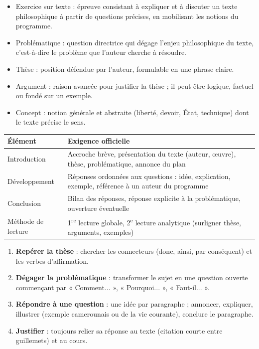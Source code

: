 \documentclass[11pt]{article}
\newcommand{\cle}[1]{{\popxbold\color{popdark}#1}}
\begin{document}
\begin{definition}
\begin{itemize}
\item \cle{Exercice sur texte} : épreuve consistant à expliquer et à discuter un texte philosophique à partir de questions précises, en mobilisant les notions du programme.
\item \cle{Problématique} : question directrice qui dégage l'enjeu philosophique du texte, c'est-à-dire le problème que l'auteur cherche à résoudre.
\item \cle{Thèse} : position défendue par l'auteur, formulable en une phrase claire.
\item \cle{Argument} : raison avancée pour justifier la thèse ; il peut être logique, factuel ou fondé sur un exemple.
\item \cle{Concept} : notion générale et abstraite (liberté, devoir, État, technique) dont le texte précise le sens.
\end{itemize}
\end{definition}

\begin{aretenir}
\begin{center}
\begin{tabularx}{\linewidth}{|l|X|}\hline
\rowcolor{popblueL} \textbf{Élément} & \textbf{Exigence officielle} \\ \hline
Introduction & Accroche brève, présentation du texte (auteur, \oe uvre), thèse, problématique, annonce du plan \\ \hline
Développement & Réponses ordonnées aux questions : idée, explication, exemple, référence à un auteur du programme \\ \hline
Conclusion & Bilan des réponses, réponse explicite à la problématique, ouverture éventuelle \\ \hline
Méthode de lecture & 1\textsuperscript{re} lecture globale, 2\textsuperscript{e} lecture analytique (surligner thèse, arguments, exemples) \\ \hline
\end{tabularx}
\end{center}
\end{aretenir}

\begin{methode}
\begin{enumerate}
\item \textbf{Repérer la thèse} : chercher les connecteurs (donc, ainsi, par conséquent) et les verbes d'affirmation.
\item \textbf{Dégager la problématique} : transformer le sujet en une question ouverte commençant par « Comment... », « Pourquoi... », « Faut-il... ».
\item \textbf{Répondre à une question} : une idée par paragraphe ; annoncer, expliquer, illustrer (exemple camerounais ou de la vie courante), conclure le paragraphe.
\item \textbf{Justifier} : toujours relier sa réponse au texte (citation courte entre guillemets) et au cours.
\end{enumerate}
\end{methode}
\end{document}
